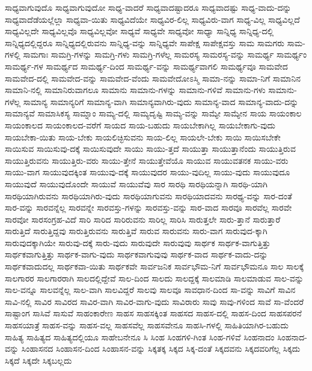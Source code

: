 {ಸಾಧ್ಯವಾಗುವುದೊ
ಸಾಧ್ಯವಾಗುವುದೋ
ಸಾಧ್ಯ-ವಾದರೆ
ಸಾಧ್ಯವಾದಷ್ಟಾದರೂ
ಸಾಧ್ಯವಾದಷ್ಟು
ಸಾಧ್ಯ-ವಾದು-ದನ್ನು
ಸಾಧ್ಯವಾದೆಡೆಯಲ್ಲೆಲ್ಲಾ
ಸಾಧ್ಯವಾ-ಯಿತು
ಸಾಧ್ಯವಿದೆಯೇ
ಸಾಧ್ಯವಿರ-ಲಿಲ್ಲ
ಸಾಧ್ಯವಿರು-ವಾಗ
ಸಾಧ್ಯ-ವಿಲ್ಲ
ಸಾಧ್ಯವಿಲ್ಲದೆ
ಸಾಧ್ಯವಿಲ್ಲದೇ
ಸಾಧ್ಯವಿಲ್ಲವೊ
ಸಾಧ್ಯವಿಲ್ಲವೋ
ಸಾಧ್ಯವೆ
ಸಾಧ್ಯವೇ
ಸಾಧ್ಯವೋ
ಸಾಧ್ಯಾ
ಸಾನ್ನಿಧ್ಯ
ಸಾನ್ನಿಧ್ಯ-ದಲ್ಲಿ
ಸಾನ್ನಿಧ್ಯದಲ್ಲಿದ್ದರೂ
ಸಾನ್ನಿಧ್ಯದಲ್ಲಿರುವನು
ಸಾನ್ನಿಧ್ಯ-ವನ್ನು
ಸಾನ್ನಿಧ್ಯವೇ
ಸಾಪೇಕ್ಷ
ಸಾಪೇಕ್ಷವಸ್ತು
ಸಾಮ
ಸಾಮಗರು
ಸಾಮ-ಗಳಲ್ಲಿ
ಸಾಮಗಾಃ
ಸಾಮಗ್ರಿ-ಗಳನ್ನು
ಸಾಮಗ್ರಿ-ಗಳು
ಸಾಮಗ್ರಿ-ಗಳೆಲ್ಲ
ಸಾಮರಸ್ಯ
ಸಾಮರಸ್ಯ-ವನ್ನು
ಸಾಮರ್ಥ್ಯ
ಸಾಮರ್ಥ್ಯಂ
ಸಾಮರ್ಥ್ಯ-ಗಳ
ಸಾಮರ್ಥ್ಯದ
ಸಾಮರ್ಥ್ಯ-ದಿಂದ
ಸಾಮರ್ಥ್ಯ-ವನ್ನು
ಸಾಮರ್ಥ್ಯವಾಗಲಿ
ಸಾಮರ್ಥ್ಯವೂ
ಸಾಮವೇದ
ಸಾಮವೇದ-ದಲ್ಲಿ
ಸಾಮವೇದ-ವನ್ನು
ಸಾಮವೇದ-ವೆಂದು
ಸಾಮವೇದೋಽಸ್ಮಿ
ಸಾಮಾ-ನನ್ನು
ಸಾಮಾ-ನಿಗೆ
ಸಾಮಾನಿನ
ಸಾಮಾನಿ-ನಲ್ಲಿ
ಸಾಮಾನಿರುವಾಗಲೂ
ಸಾಮಾನು
ಸಾಮಾನು-ಗಳನ್ನು
ಸಾಮಾನು-ಗಳಿವೆ
ಸಾಮಾನು-ಗಳು
ಸಾಮಾನು-ಗಳೆಲ್ಲ
ಸಾಮಾನ್ಯ
ಸಾಮಾನ್ಯರಿಗೆ
ಸಾಮಾನ್ಯ-ವಾಗಿ
ಸಾಮಾನ್ಯವಾಗಿರು-ವುದು
ಸಾಮಾನ್ಯ-ವಾದ
ಸಾಮಾನ್ಯ-ವಾದು-ದನ್ನು
ಸಾಮಾನ್ಯವೆ
ಸಾಮಾಸಿಕಸ್ಯ
ಸಾಮ್ನಾಂ
ಸಾಮ್ಯ-ದಲ್ಲಿ
ಸಾಮ್ಯದೃಷ್ಟಿ
ಸಾಮ್ಯ-ವನ್ನು
ಸಾಮ್ಯೇ
ಸಾಮ್ಯೇನ
ಸಾಯ
ಸಾಯಂಕಾಲ
ಸಾಯಂಕಾಲದ
ಸಾಯಂಕಾಲದ-ವರೆಗೆ
ಸಾಯದ
ಸಾಯ-ಬಹುದು
ಸಾಯಬೇಕಾಗಿಲ್ಲ
ಸಾಯಬೇಕಾಗು-ವುದು
ಸಾಯಬೇಕಾ-ಯಿತು
ಸಾಯ-ಬೇಕು
ಸಾಯಲಿಚ್ಛಿಸುವನು
ಸಾಯ-ಲಿಲ್ಲ
ಸಾಯಲೇ-ಬೇಕು
ಸಾಯಿ
ಸಾಯಿಸಬೇಕೇ
ಸಾಯಿಸುವ
ಸಾಯಿಸುವು-ದಕ್ಕೆ
ಸಾಯಿಸುವುದೇ
ಸಾಯು
ಸಾಯು-ತ್ತದೆ
ಸಾಯುತ್ತಾ
ಸಾಯುತ್ತಾನೆಂದು
ಸಾಯುತ್ತಿರುವ
ಸಾಯುತ್ತಿರುವನು
ಸಾಯುತ್ತಿರು-ವರು
ಸಾಯು-ತ್ತೇನೆ
ಸಾಯುತ್ತೇವೆಯೊ
ಸಾಯುವ
ಸಾಯುವತನಕ
ಸಾಯು-ವರು
ಸಾಯು-ವಾಗ
ಸಾಯುವುದಕ್ಕಿಂತ
ಸಾಯುವು-ದಕ್ಕೆ
ಸಾಯುವುದರ
ಸಾಯು-ವುದಿಲ್ಲ
ಸಾಯು-ವುದು
ಸಾಯುವುದೂ
ಸಾಯುವುದೆ
ಸಾಯುವುದೊಂದೇ
ಸಾಯುವೆ
ಸಾಯುವೆವು
ಸಾರ
ಸಾರಥಿ
ಸಾರಥಿಯನ್ನಾಗಿ
ಸಾರಥಿ-ಯಾಗಿ
ಸಾರಥಿಯಾಗಿರುವನು
ಸಾರಥಿಯಾಗಿರು-ವುದು
ಸಾರಥಿಯಾಗುವನು
ಸಾರಥಿಯಾದವನು
ಸಾರಥ್ಯ-ವನ್ನು
ಸಾರ-ದಂತೆ
ಸಾರ-ವನ್ನು
ಸಾರವನ್ನೆಲ್ಲ
ಸಾರವನ್ನೇ
ಸಾರವಸ್ತು-ಗಳನ್ನು
ಸಾರವಸ್ತು-ವನ್ನು
ಸಾರ-ವಾದ
ಸಾರವೂ
ಸಾರವೆಲ್ಲ
ಸಾರವೇ
ಸಾರವೋ
ಸಾರಸಂಗ್ರಹ-ವಿದೆ
ಸಾರಿ
ಸಾರಿದ
ಸಾರಿರುವನು
ಸಾರಿಲ್ಲ
ಸಾರಿಸಿ
ಸಾರುತ್ತಲೇ
ಸಾರು-ತ್ತಾನೆ
ಸಾರುತ್ತಾರೆ
ಸಾರುತ್ತಿದೆ
ಸಾರುತ್ತಿದ್ದವು
ಸಾರುತ್ತಿರುವನು
ಸಾರುತ್ತಿವೆ
ಸಾರುವ
ಸಾರುವನು
ಸಾರು-ವಾಗ
ಸಾರುವುದ-ಕ್ಕಾಗಿ
ಸಾರುವುದಕ್ಕಾಗಿಯೇ
ಸಾರುವು-ದಕ್ಕೆ
ಸಾರು-ವುದು
ಸಾರುವುದೇ
ಸಾರುವುವು
ಸಾರ್ಥಕ
ಸಾರ್ಥಕ-ವಾಗುತ್ತಿತ್ತು
ಸಾರ್ಥಕವಾಗುತ್ತಿತ್ತು
ಸಾರ್ಥಕ-ವಾಗು-ವುದು
ಸಾರ್ಥಕವಾಗುವುವು
ಸಾರ್ಥಕ-ವಾದ
ಸಾರ್ಥಕ-ವಾದು-ದನ್ನು
ಸಾರ್ಥಕವಾದುದಲ್ಲ
ಸಾರ್ಥಕವಾ-ಯಿತು
ಸಾರ್ಥಕವೇ
ಸಾರ್ವಜನಿಕ
ಸಾರ್ವಭೌಮ-ನಿಗೆ
ಸಾರ್ವಭೌಮನೂ
ಸಾಲ
ಸಾಲಕ್ಕೆ
ಸಾಲಗಾರರ
ಸಾಲಗಾರರಾಗಿ
ಸಾಲದಲ್ಲಿದ್ದೇವೆ
ಸಾಲ-ದಿಂದ
ಸಾಲದು
ಸಾಲದ್ದಕ್ಕೆ
ಸಾಲಮಾಡಿ
ಸಾಲಮಾಡುವ
ಸಾಲ-ವನ್ನು
ಸಾಲ-ವನ್ನೂ
ಸಾಲವನ್ನೆಲ್ಲ
ಸಾಲ-ವಾಗಿ
ಸಾಲವಿದ್ದರೆ
ಸಾಲವು
ಸಾಲವೂ
ಸಾವಧಾನ-ದಿಂದ
ಸಾ-ವನ್ನು
ಸಾವಿಗೆ
ಸಾವಿನ
ಸಾವಿ-ನಲ್ಲಿ
ಸಾವಿರ
ಸಾವಿರದ
ಸಾವಿರ-ವಾಗಿ
ಸಾವಿರ-ವಾಗು-ವುದು
ಸಾವಿರಾರು
ಸಾವು
ಸಾವು-ಗಳಿಂದ
ಸಾವೆ
ಸಾ-ವೆಂದರೆ
ಸಾಷ್ಟಾಂಗ
ಸಾಸಿವೆ
ಸಾಸುವೆ
ಸಾಹಂಕಾರೇಣ
ಸಾಹಸ
ಸಾಹಸಕ್ಕಿಂತ
ಸಾಹಸದ
ಸಾಹಸ-ದಲ್ಲಿ
ಸಾಹಸ-ದಿಂದ
ಸಾಹಸಪರನೆ
ಸಾಹಸಯಾತ್ರೆ
ಸಾಹಸ-ವನ್ನು
ಸಾಹಸ-ವಲ್ಲ
ಸಾಹಸವೆಲ್ಲ
ಸಾಹಸವೇನೂ
ಸಾಹಸಿ-ಗಳಲ್ಲಿ
ಸಾಹಿತಿಯಾಗಿರ-ಬಹುದು
ಸಾಹಿತ್ಯ
ಸಾಹಿತ್ಯದ
ಸಾಹಿತ್ಯದಲ್ಲಿಯೂ
ಸಾಹೇಬನೇನೂ
ಸಿ
ಸಿಂಹ
ಸಿಂಹಗಳಿ-ಗಿಂತ
ಸಿಂಹ-ಗಳಿವೆ
ಸಿಂಹನಾದಂ
ಸಿಂಹನಾದ-ವನ್ನು
ಸಿಂಹಾಸನದ
ಸಿಂಹಾಸನ-ದಿಂದ
ಸಿಂಹಾಸನ-ವನ್ನು
ಸಿಕ್ಕತಕ್ಕ
ಸಿಕ್ಕದ
ಸಿಕ್ಕ-ದಂತೆ
ಸಿಕ್ಕದವನು
ಸಿಕ್ಕದವರಿಗೆಲ್ಲ
ಸಿಕ್ಕದು
ಸಿಕ್ಕದೆ
ಸಿಕ್ಕದೇ
ಸಿಕ್ಕಬಲ್ಲದು
}
